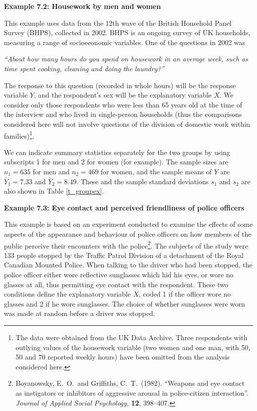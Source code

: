 \textbf{Example 7.2: Housework by men and women}

This example uses data from the 12th wave of the British Household Panel
Survey (BHPS), collected in 2002. BHPS is an ongoing survey of UK
households, measuring a range of socioeconomic variables.
One of the questions in 2002 was

\emph{``About how many hours do you spend on housework in an average week,
such as time spent cooking, cleaning and doing the laundry?''}

The response to this question (recorded in whole hours) will be the
response variable $Y$, and the respondent's sex will be the explanatory
variable $X$. We consider only those respondents who were less than 65
years old at the time of the interview and who lived in single-person
households (thus the comparisons considered here will not involve
questions of the division of domestic work within families)\footnote{The
data were obtained from the UK Data Archive. Three respondents with
outlying values of the housework variable (two women and one man, with
50, 50 and 70 reported weekly hours) have been omitted from the analysis
considered here.}.

We can indicate summary statistics separately for the two groups by
using subscripts 1 for men and 2 for women (for example). The sample
sizes are $n_{1}=635$ for men and $n_{2}=469$ for women, and the sample
means of $Y$ are $\bar{Y}_{1}=7.33$ and $\bar{Y}_{2}=8.49$. These and
the sample standard deviations $s_{1}$ and $s_{2}$ are also shown in
Table \ref{t_groupex}.

\textbf{Example 7.3: Eye contact and perceived friendliness of police
officers}

This example is based on an experiment conducted to examine the effects
of some aspects of the appearance and behaviour of police officers on
how members of the public perceive their encounters with the
police\footnote{Boyanowsky, E.\ O.\ and Griffiths, C.\ T.\ (1982).
``Weapons and eye contact as instigators or inhibitors of aggressive
arousal in police-citizen interaction''. \emph{Journal of Applied Social
Psychology}, \textbf{12}, 398--407.}. The subjects of
the study were 133 people stopped by the Traffic Patrol Division of a
detachment of the Royal Canadian Mounted Police. When talking to the
driver who had been stopped, the police officer either wore reflective
sunglasses which hid his eyes, or wore no glasses at all, thus
permitting eye contact with the respondent. These two conditions define
the explanatory variable $X$, coded 1 if the officer wore no glasses and
2 if he wore sunglasses. The choice of whether sunglasses were worn was
made at random before a driver was stopped.


